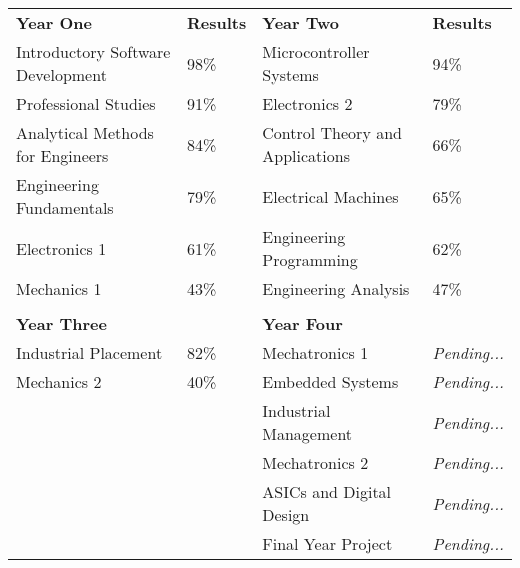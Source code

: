 \documentclass[10pt,a4paper,ragged2e,withhyper]{altacv}
\begin{document}
\medskip




\vspace{-1em}
\begin{table}[htbp!]
    \centering
    \def\arraystretch{0.8}%
    {\color{LightGrey}\begin{tabular}{p{6.5cm}p{2cm}p{6.5cm}p{2cm}}
    	\textbf{Year One} & \textbf{Results} & \textbf{Year Two} & \textbf{Results} \\
    	
		Introductory Software Development & 98\% 	& 	Microcontroller Systems & 94\% \\
		
		Professional Studies & 91\% 	& 	Electronics 2 & 79\% \\
		
		Analytical Methods for Engineers & 84\% 	& 	Control Theory and Applications & 66\% \\
		
		Engineering Fundamentals & 79\% & Electrical Machines & 65\% \\
		
		Electronics 1 & 61\% & Engineering Programming & 62\% \\

		Mechanics 1 & 43\% & Engineering Analysis & 47\% \\
		
		 & & & \\
		
		\textbf{Year Three} & & \textbf{Year Four} & \\
		
		Industrial Placement & 82\% & Mechatronics 1 & \textit{Pending...}\\
		
		Mechanics 2 & 40\% & Embedded Systems & \textit{Pending...} \\
		
		 & & Industrial Management & \textit{Pending...} \\
		 
		 & & Mechatronics 2 & \textit{Pending...} \\
		 
		 & & ASICs and Digital Design & \textit{Pending...} \\

		 & & Final Year Project & \textit{Pending...} \\
    \end{tabular}}
    \label{tab:ulster_uni_degree}
\end{table}
\vspace{-1.5em}
\end{document}
